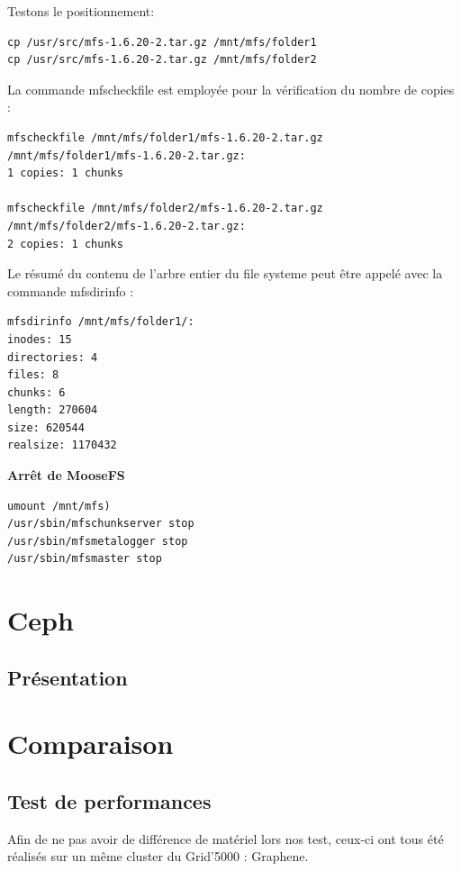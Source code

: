 \documentclass[12pt]{report}
\begin{document}
Testons le positionnement:
\begin{lstlisting}
cp /usr/src/mfs-1.6.20-2.tar.gz /mnt/mfs/folder1
cp /usr/src/mfs-1.6.20-2.tar.gz /mnt/mfs/folder2
	  \end{lstlisting}
La commande mfscheckfile est employée pour la vérification du nombre de copies :
\begin{lstlisting}
mfscheckfile /mnt/mfs/folder1/mfs-1.6.20-2.tar.gz
/mnt/mfs/folder1/mfs-1.6.20-2.tar.gz:
1 copies: 1 chunks

mfscheckfile /mnt/mfs/folder2/mfs-1.6.20-2.tar.gz
/mnt/mfs/folder2/mfs-1.6.20-2.tar.gz:
2 copies: 1 chunks
	  \end{lstlisting}
Le résumé du contenu de l'arbre entier du file systeme peut être appelé avec la commande mfsdirinfo :
\begin{lstlisting}
mfsdirinfo /mnt/mfs/folder1/:
inodes: 15
directories: 4
files: 8
chunks: 6
length: 270604
size: 620544
realsize: 1170432
	  \end{lstlisting}
\textbf{Arrêt de MooseFS}\\
\begin{lstlisting}
umount /mnt/mfs)
/usr/sbin/mfschunkserver stop
/usr/sbin/mfsmetalogger stop
/usr/sbin/mfsmaster stop
	  \end{lstlisting}

	\chapter{Ceph}
		\section{Présentation}

	\chapter{Comparaison}
		\section{Test de performances}
			Afin de ne pas avoir de différence de matériel lors nos test, ceux-ci ont tous été réalisés sur un même cluster du Grid'5000 : Graphene.\\
\end{document}
